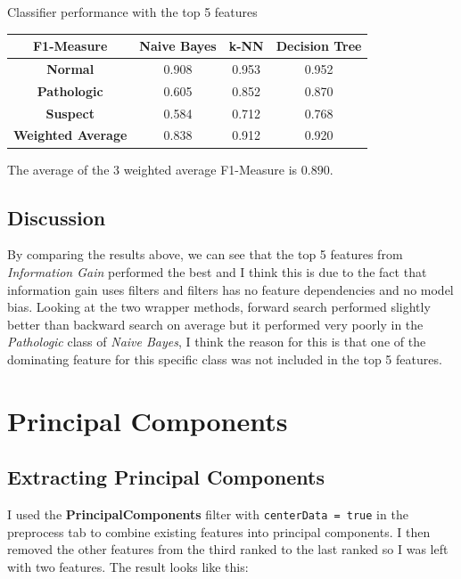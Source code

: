 \documentclass[12pt]{article}
\begin{document}
\begin{section}{Classifier performance with the top 5 features}
 \begin{center}
     \begin{tabular}{| c | c | c | c |}
         \hline
         \textbf{F1-Measure}       & \textbf{Naive Bayes} & \textbf{k-NN} & \textbf{Decision Tree} \\ [0.5ex]
         \hline
         \textbf{Normal}           & 0.908                & 0.953         & 0.952                  \\
         \hline
         \textbf{Pathologic}       & 0.605                & 0.852         & 0.870                  \\
         \hline
         \textbf{Suspect}          & 0.584                & 0.712         & 0.768                  \\
         \hline
         \hline
         \textbf{Weighted Average} & 0.838                & 0.912         & 0.920                  \\
         \hline
     \end{tabular}
 \end{center}

 The average of the 3 weighted average F1-Measure is $0.890$.

 \subsection{Discussion}
 By comparing the results above, we can see that the top 5 features from \textit{Information Gain} performed
 the best and I think this is due to the fact that information gain uses filters and filters has no feature
 dependencies and no model bias. Looking at the two wrapper methods, forward search performed slightly better
 than backward search on average but it performed very poorly in the \textit{Pathologic} class of \textit{Naive Bayes},
 I think the reason for this is that one of the dominating feature for this specific class was not included in the
 top 5 features.
\end{section}

\section{Principal Components}
\subsection{Extracting Principal Components}
I used the \textbf{PrincipalComponents} filter with \texttt{centerData = true} in the preprocess tab to combine existing
features into principal components. I then removed the other features from the third ranked to the last ranked so I
was left with two features. The result looks like this:
\end{document}
